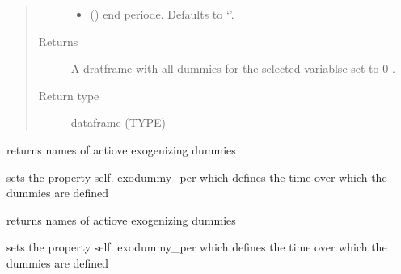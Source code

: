 \documentclass[letterpaper,10pt,english]{sphinxmanual}
\begin{document}
\begin{fulllineitems}
\begin{fulllineitems}
\begin{quote}
\begin{description}
\begin{itemize}
\item {} 
\sphinxAtStartPar
{} (\sphinxstyleliteralemphasis{\sphinxupquote{, }}) \textendash{} end periode. Defaults to ‘’.

\end{itemize}

\item[{Returns}] \leavevmode
\sphinxAtStartPar
A dratframe with all dummies for the selected variablse set to 0 .

\item[{Return type}] \leavevmode
\sphinxAtStartPar
dataframe (TYPE)

\end{description}\end{quote}

\end{fulllineitems}


\begin{fulllineitems}
\label{\detokenize{core/modelclass:modelclass.WB_Mixin.find_fix_dummy_fixed}}
\pysigstartsignatures
{}
\pysigstopsignatures
\sphinxAtStartPar
returns names of actiove exogenizing dummies

\sphinxAtStartPar
sets the property self. exodummy\_per which defines the time over which the dummies are defined

\end{fulllineitems}


\begin{fulllineitems}
\label{\detokenize{core/modelclass:modelclass.WB_Mixin.fix_dummy_fixed}}
\pysigstartsignatures
{}
\pysigstopsignatures
\sphinxAtStartPar
returns names of actiove exogenizing dummies

\sphinxAtStartPar
sets the property self. exodummy\_per which defines the time over which the dummies are defined


\end{fulllineitems}
\end{fulllineitems}
\end{document}
